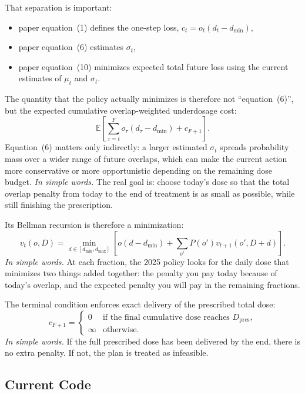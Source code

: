\documentclass[11pt]{article}
\newcommand{\Dpres}{D_{\mathrm{pres}}}
\begin{document}
That separation is important:
\begin{itemize}
\item paper equation~(1) defines the one-step loss, $c_t = o_t(d_t-d_{\min})$,
\item paper equation~(6) estimates $\sigma_t$,
\item paper equation~(10) minimizes expected total future loss using the current estimates of $\mu_t$ and $\sigma_t$.
\end{itemize}

The quantity that the policy actually minimizes is therefore not ``equation~(6)'', but the expected cumulative overlap-weighted underdosage cost:
\begin{equation}
\mathbb{E}\!\left[\sum_{\tau=t}^{F} o_\tau(d_\tau-d_{\min}) + c_{F+1}\right].
\end{equation}
Equation~(6) matters only indirectly: a larger estimated $\sigma_t$ spreads probability mass over a wider range of future overlaps, which can make the current action more conservative or more opportunistic depending on the remaining dose budget.
\noindent\textit{In simple words.} The real goal is: choose today's dose so that the total overlap penalty from today to the end of treatment is as small as possible, while still finishing the prescription.

Its Bellman recursion is therefore a minimization:
\begin{equation}
v_t(o,D) =
\min_{d \in [d_{\min},d_{\max}]}
\left[
o(d-d_{\min}) + \sum_{o'} P(o') v_{t+1}(o', D+d)
\right].
\end{equation}
\noindent\textit{In simple words.} At each fraction, the 2025 policy looks for the daily dose that minimizes two things added together: the penalty you pay today because of today's overlap, and the expected penalty you will pay in the remaining fractions.

The terminal condition enforces exact delivery of the prescribed total dose:
\begin{equation}
c_{F+1} =
\begin{cases}
0 & \text{if the final cumulative dose reaches } \Dpres,\\
\infty & \text{otherwise.}
\end{cases}
\end{equation}
\noindent\textit{In simple words.} If the full prescribed dose has been delivered by the end, there is no extra penalty. If not, the plan is treated as infeasible.

\subsection{Current Code}
\end{document}
